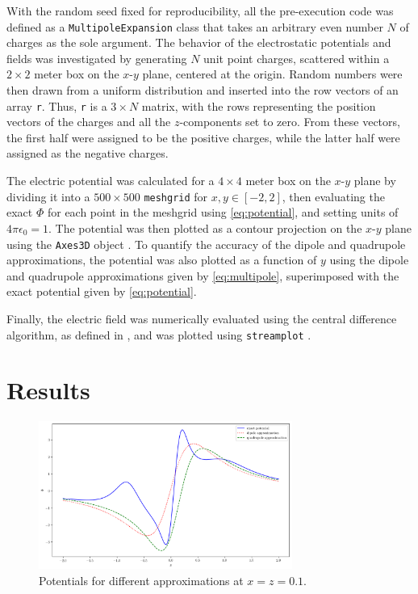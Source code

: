 \documentclass[10pt,a4paper,twoside]{article}
\begin{document}
With the random seed fixed for reproducibility, all the pre-execution code was defined as a \texttt{MultipoleExpansion} class that takes an arbitrary even number $N$ of charges as the sole argument. The behavior of the electrostatic potentials and fields was investigated by generating $N$ unit point charges, scattered within a $2 \times 2$ meter box on the $x$-$y$ plane, centered at the origin. Random numbers were then drawn from a uniform distribution and inserted into the row vectors of an array \texttt{r}. Thus, \texttt{r} is a $3 \times N$ matrix, with the rows representing the position vectors of the charges and all the $z$-components set to zero. From these vectors, the first half were assigned to be the positive charges, while the latter half were assigned as the negative charges.

The electric potential was calculated for a $4 \times 4$ meter box on the $x$-$y$ plane by dividing it into a $500 \times 500$ \texttt{meshgrid} for $x,y \in [-2,2]$, then evaluating the exact $\Phi$ for each point in the meshgrid using \eqref{eq:potential}, and setting units of $4\pi\epsilon_0 = 1$. The potential was then plotted as a contour projection on the $x$-$y$ plane using the \texttt{Axes3D} object \cite{matplotlib}. To quantify the accuracy of the dipole and quadrupole approximations, the potential was also plotted as a function of $y$ using the dipole and quadrupole approximations given by \eqref{eq:multipole}, superimposed with the exact potential given by \eqref{eq:potential}.

Finally, the electric field was numerically evaluated using the central difference algorithm, as defined in \cite{wilmott}\cite{olver}, and was plotted using \texttt{streamplot} \cite{christian}.

\section{Results}
\label{sec:RnD}
\medskip

\begin{figure}[tb]
	\centering
	\includegraphics[width=0.74\textwidth]{116.png}
	\caption{Potentials for different approximations at $x = z = 0.1$.}
	\label{fig:approx}
\end{figure}
\end{document}
